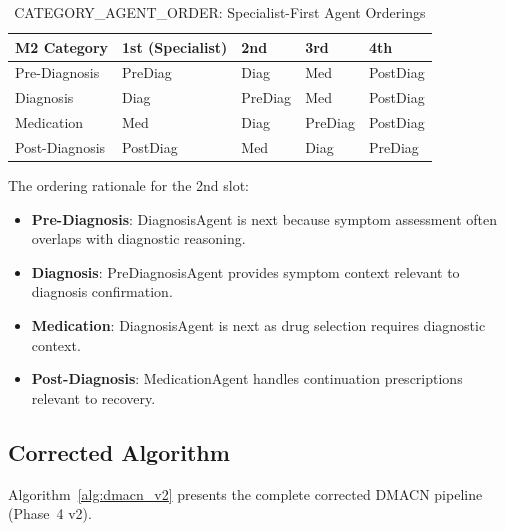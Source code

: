 \documentclass[a4paper,12pt]{article}
\begin{document}
\begin{table}[h]
\centering
\caption{CATEGORY\_AGENT\_ORDER: Specialist-First Agent Orderings}
\label{tab:cao}
\begin{tabular}{lllll}
\toprule
\textbf{M2 Category} & \textbf{1st (Specialist)} & \textbf{2nd} & \textbf{3rd} & \textbf{4th} \\
\midrule
Pre-Diagnosis  & PreDiag & Diag & Med & PostDiag \\
Diagnosis      & Diag & PreDiag & Med & PostDiag \\
Medication     & Med & Diag & PreDiag & PostDiag \\
Post-Diagnosis & PostDiag & Med & Diag & PreDiag \\
\bottomrule
\end{tabular}
\end{table}

The ordering rationale for the 2nd slot:
\begin{itemize}[noitemsep]
  \item \textbf{Pre-Diagnosis}: DiagnosisAgent is next because symptom
        assessment often overlaps with diagnostic reasoning.
  \item \textbf{Diagnosis}: PreDiagnosisAgent provides symptom context
        relevant to diagnosis confirmation.
  \item \textbf{Medication}: DiagnosisAgent is next as drug selection
        requires diagnostic context.
  \item \textbf{Post-Diagnosis}: MedicationAgent handles continuation
        prescriptions relevant to recovery.
\end{itemize}

\subsection{Corrected Algorithm}

Algorithm~\ref{alg:dmacn_v2} presents the complete corrected DMACN
pipeline (Phase~4 v2).
\end{document}
